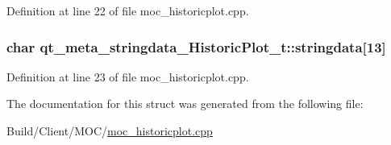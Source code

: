 Definition at line 22 of file moc\+\_\+historicplot.\+cpp.

\hypertarget{structqt__meta__stringdata___historic_plot__t_a943900759e5308de32b03999227b8b8f}{}
\subsubsection[{stringdata}]{\setlength{\rightskip}{0pt plus 5cm}char qt\+\_\+meta\+\_\+stringdata\+\_\+\+Historic\+Plot\+\_\+t\+::stringdata\mbox{[}13\mbox{]}}\label{structqt__meta__stringdata___historic_plot__t_a943900759e5308de32b03999227b8b8f}


Definition at line 23 of file moc\+\_\+historicplot.\+cpp.



The documentation for this struct was generated from the following file\+:\begin{DoxyCompactItemize}
\item 
Build/\+Client/\+M\+O\+C/\hyperlink{moc__historicplot_8cpp}{moc\+\_\+historicplot.\+cpp}\end{DoxyCompactItemize}
